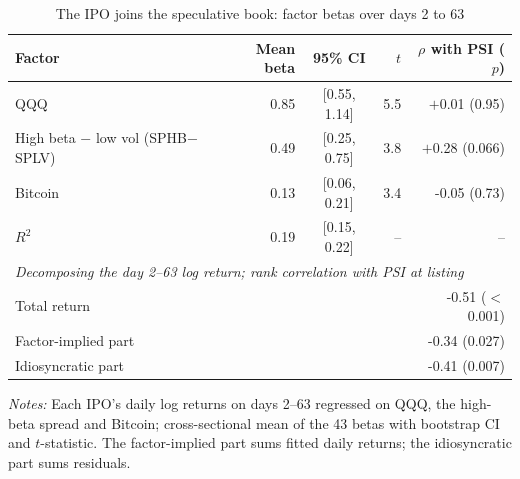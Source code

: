 \begin{table}[!htbp]\centering\footnotesize
\caption{The IPO joins the speculative book: factor betas over days 2 to 63}\label{tab:betas}

\begin{threeparttable}
\begin{tabular}{lrcrr}
\toprule
Factor & Mean beta & 95\% CI & $t$ & $\rho$ with PSI ($p$) \\
\midrule
QQQ & 0.85 & [0.55, 1.14] & 5.5 & $+$0.01 (0.95) \\
High beta $-$ low vol (SPHB$-$SPLV) & 0.49 & [0.25, 0.75] & 3.8 & $+$0.28 (0.066) \\
Bitcoin & 0.13 & [0.06, 0.21] & 3.4 & -0.05 (0.73) \\
$R^2$ & 0.19 & [0.15, 0.22] & -- & -- \\
\midrule
\multicolumn{5}{l}{\textit{Decomposing the day 2--63 log return; rank correlation with PSI at listing}} \\
\quad Total return & & & & -0.51 ($<$0.001) \\
\quad Factor-implied part & & & & -0.34 (0.027) \\
\quad Idiosyncratic part & & & & -0.41 (0.007) \\
\bottomrule
\end{tabular}
\begin{tablenotes}[flushleft]\footnotesize
\item \textit{Notes:} Each IPO's daily log returns on days 2--63 regressed on QQQ, the high-beta spread and Bitcoin; cross-sectional mean of the 43 betas with bootstrap CI and $t$-statistic. The factor-implied part sums fitted daily returns; the idiosyncratic part sums residuals.
\end{tablenotes}
\end{threeparttable}

\end{table}

